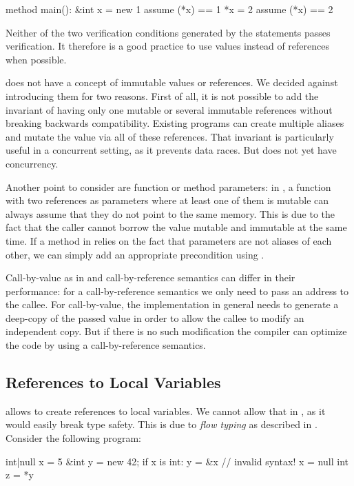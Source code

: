 \begin{whileycode}
method main():
	&int x = new 1
	assume (*x) == 1
	*x = 2
	assume (*x) == 2
\end{whileycode}

\noindent Neither of the two verification conditions generated by the  statements passes verification.
It therefore is a good practice to use values instead of references when possible.

\whiley does not have a concept of immutable values or references.
We decided against introducing them for two reasons.
First of all, it is not possible to add the invariant of having only one mutable or several immutable references without breaking backwards compatibility.
Existing programs can create multiple aliases and mutate the value via all of these references.
That invariant is particularly useful in a concurrent setting, as it prevents data races.
But \whiley does not yet have concurrency.

Another point to consider are function or method parameters:
in \rust, a function with two references as parameters where at least one of them is mutable can always assume that they do not point to the same memory.
This is due to the fact that the caller cannot borrow the value mutable and immutable at the same time.
If a method in \whiley relies on the fact that parameters are not aliases of each other, we can simply add an appropriate precondition using .

Call-by-value as in \whiley and call-by-reference semantics can differ in their performance:
for a call-by-reference semantics we only need to pass an address to the callee.
For call-by-value, the implementation in general needs to generate a deep-copy of the passed value in order to allow the callee to modify an independent copy.
But if there is no such modification the compiler can optimize the code by using a call-by-reference semantics.


\subsection{References to Local Variables}
\rust allows to create references to local variables.
We cannot allow that in \whiley, as it would easily break type safety.
This is due to \emph{flow typing} as described in .
Consider the following program:

\begin{whileycode}
int|null x = 5
&int y = new 42;
if x is int:
	y = &x // invalid syntax!
x = null
int z = *y
\end{whileycode}

